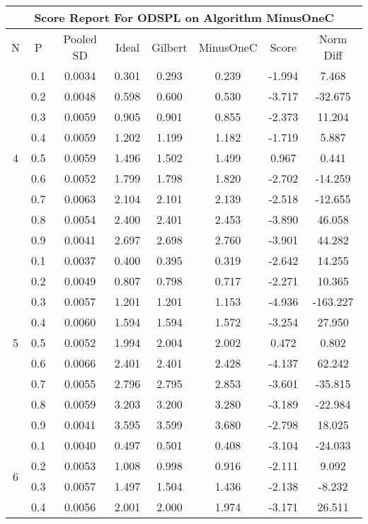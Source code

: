 \documentclass[11pt,a4paper]{report}
\begin{document}
\begin{longtable}{ | c | c || c | c | c | c | c | c | }
\hline
\multicolumn{8}{|c|}{ Score Report For ODSPL on Algorithm MinusOneC} \\
\hline
N & P & Pooled SD &  Ideal &  Gilbert & MinusOneC  & Score & Norm Diff \\
 \hline
 \hline
 \endhead
\multirow{9}{*}{4} & 0.1 & 0.0034 & 0.301 & 0.293 & 0.239 & -1.994 & 7.468 \\
 & 0.2 & 0.0048 & 0.598 & 0.600 & 0.530 & -3.717 & -32.675 \\
 & 0.3 & 0.0059 & 0.905 & 0.901 & 0.855 & -2.373 & 11.204 \\
 & 0.4 & 0.0059 & 1.202 & 1.199 & 1.182 & -1.719 & 5.887 \\
 & 0.5 & 0.0059 & 1.496 & 1.502 & 1.499 & 0.967 & 0.441 \\
 & 0.6 & 0.0052 & 1.799 & 1.798 & 1.820 & -2.702 & -14.259 \\
 & 0.7 & 0.0063 & 2.104 & 2.101 & 2.139 & -2.518 & -12.655 \\
 & 0.8 & 0.0054 & 2.400 & 2.401 & 2.453 & -3.890 & 46.058 \\
 & 0.9 & 0.0041 & 2.697 & 2.698 & 2.760 & -3.901 & 44.282 \\
 \hline
\multirow{9}{*}{5} & 0.1 & 0.0037 & 0.400 & 0.395 & 0.319 & -2.642 & 14.255 \\
 & 0.2 & 0.0049 & 0.807 & 0.798 & 0.717 & -2.271 & 10.365 \\
 & 0.3 & 0.0057 & 1.201 & 1.201 & 1.153 & -4.936 & -163.227 \\
 & 0.4 & 0.0060 & 1.594 & 1.594 & 1.572 & -3.254 & 27.950 \\
 & 0.5 & 0.0052 & 1.994 & 2.004 & 2.002 & 0.472 & 0.802 \\
 & 0.6 & 0.0066 & 2.401 & 2.401 & 2.428 & -4.137 & 62.242 \\
 & 0.7 & 0.0055 & 2.796 & 2.795 & 2.853 & -3.601 & -35.815 \\
 & 0.8 & 0.0059 & 3.203 & 3.200 & 3.280 & -3.189 & -22.984 \\
 & 0.9 & 0.0041 & 3.595 & 3.599 & 3.680 & -2.798 & 18.025 \\
 \hline
\multirow{9}{*}{6} & 0.1 & 0.0040 & 0.497 & 0.501 & 0.408 & -3.104 & -24.033 \\
 & 0.2 & 0.0053 & 1.008 & 0.998 & 0.916 & -2.111 & 9.092 \\
 & 0.3 & 0.0057 & 1.497 & 1.504 & 1.436 & -2.138 & -8.232 \\
 & 0.4 & 0.0056 & 2.001 & 2.000 & 1.974 & -3.171 & 26.511 \\

\end{longtable}
\end{document}
